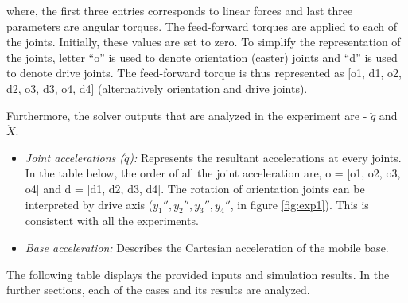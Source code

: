 where, the first three entries corresponds to linear forces and last three parameters are angular torques. The feed-forward torques are applied to each of the joints. Initially, these values are set to zero. To simplify the representation of the joints, letter ``o'' is used to denote orientation (caster) joints and ``d'' is used to denote drive joints. The feed-forward torque is thus represented as [o1, d1, o2, d2, o3, d3, o4, d4] (alternatively orientation and drive joints).


Furthermore, the solver outputs that are analyzed in the experiment are - $\ddot{q}$ and $\ddot{X}$. 
\begin{itemize}
	\item \textit{Joint accelerations ($\ddot{q}$):} Represents the resultant accelerations at every joints. In the table below, the order of all the joint acceleration are, o = [o1, o2, o3, o4] and d = [d1, d2, d3, d4]. The rotation of orientation joints can be interpreted by drive axis ($y_1'', y_2'', y_3'', y_4''$, in figure \ref{fig:exp1}). This is consistent with all the experiments.
	\item \textit{Base acceleration:} Describes the Cartesian acceleration of the mobile base.
\end{itemize} 

The following table displays the provided inputs and simulation results. In the further sections, each of the cases and its results are analyzed.

